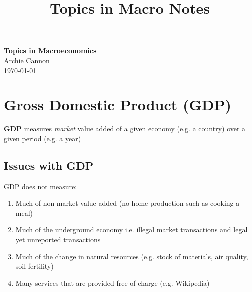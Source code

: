 \documentclass[11pt]{article}
\begin{document}
\title{Topics in Macro Notes}

\thispagestyle{empty}

\begin{center}
{\LARGE \bf Topics in Macroeconomics}\\
{\large Archie Cannon}\\
\today
\end{center}

{
\begin{tcolorbox}[title=Contents, fonttitle=\huge\sffamily\bfseries\selectfont,interior style={left color=contcol1!40!white,right color=contcol2!40!white},frame style={left color=contcol1!80!white,right color=contcol2!80!white},coltitle=black,top=2mm,bottom=2mm,left=2mm,right=2mm,drop fuzzy shadow,enhanced,breakable]
\makeatletter
{}
\makeatother
\end{tcolorbox}}

\section{Gross Domestic Product (GDP)}

\begin{shaded}
\textbf{GDP} measures \textit{market} value added of a given economy (e.g. a country) over a given period (e.g. a year)
\end{shaded}

\subsection*{Issues with GDP}

GDP does not measure:
\begin{enumerate}
    \item Much of non-market value added (no home production such as cooking a meal)
    \item Much of the underground economy i.e. illegal market transactions and legal yet unreported transactions
    \item Much of the change in natural resources (e.g. stock of materials, air quality, soil fertility)
    \item Many services that are provided free of charge (e.g. Wikipedia)
\end{enumerate}
\end{document}
